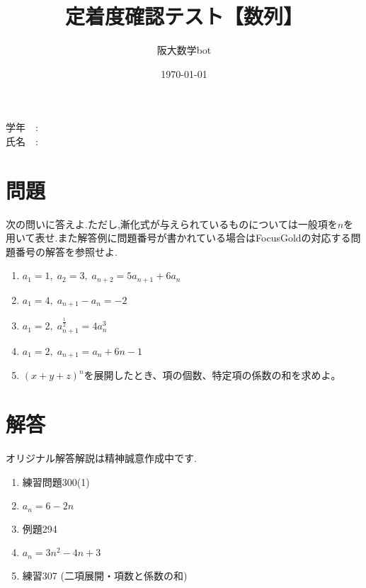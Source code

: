 \documentclass[10pt]{ltjarticle}
\title{定着度確認テスト【数列】}
\date{\today}
\author{阪大数学bot}
\begin{document}
\maketitle
学年\ \ :\\[5pt]

氏名\ \ :

\section*{問題}

次の問いに答えよ.ただし,漸化式が与えられているものについては一般項を$n$を用いて表せ.また解答例に問題番号が書かれている場合はFocusGoldの対応する問題番号の解答を参照せよ.

\begin{enumerate}[label=\textbf{\fbox{\arabic*}}]
  \item \(a_1=1,\;a_2=3,\;a_{n+2}=5a_{n+1}+6a_n\)
  \item \(a_1=4,\;a_{n+1}-a_n=-2\)
  \item \(a_1=2,\;a_{n+1}^{\frac{1}{2}}=4a_n^3\)
  \item \(a_1=2,\;a_{n+1}=a_n+6n-1\)
  \item \((x+y+z)^n\)を展開したとき、項の個数、特定項の係数の和を求めよ。
\end{enumerate}

\bigskip

\newpage
\section*{解答}
オリジナル解答解説は精神誠意作成中です.
\begin{enumerate}[label=\textbf{\fbox{\arabic*}}]
  \item 練習問題300(1)
  \item \(a_n = 6 - 2n\)
  \item 例題294
  \item \(a_n = 3n^2 - 4n + 3\)
  \item 練習307 (二項展開・項数と係数の和)
\end{enumerate}
\end{document}
